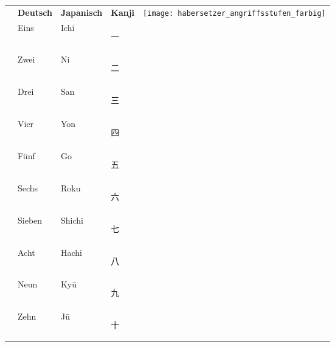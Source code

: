 \begin{tcolorbox}[width=\textwidth,height=\textheight,right=12pt,left=12pt,colframe=lightgray,colback=white,fonttitle=\bfseries,coltitle=black,title=Allgemeines:\indent Zahlen - Angriffsstufen - Begriffe]
	\null\vfill\null	
	\begin{tabularx}{\textwidth}{lllll}		
		& \textbf{Deutsch} 	& \textbf{Japanisch} 	& \textbf{Kanji} &\multirow{13}{*}{\texttt{[image: habersetzer\_angriffsstufen\_farbig]}} \\
		\ctuz 	& Eins 				& Ichi 					& \begin{CJK*}{UTF8}{ipxm}\color{Navy}一\end{CJK*} 	& \\
		\ctuz 	& Zwei 				& Ni 					& \begin{CJK*}{UTF8}{ipxm}\color{Navy}二\end{CJK*} 	& \\ 
		\ctuz 	& Drei 				& San 					& \begin{CJK*}{UTF8}{ipxm}\color{Navy}三\end{CJK*} 	& \\
		\ctuz 	& Vier 				& Yon 					& \begin{CJK*}{UTF8}{ipxm}\color{Navy}四\end{CJK*} 	& \\
		\ctuz 	& Fünf 				& Go 					& \begin{CJK*}{UTF8}{ipxm}\color{Navy}五\end{CJK*} 	& \\
		\ctuz 	& Sechs 			& Roku 					& \begin{CJK*}{UTF8}{ipxm}\color{Navy}六\end{CJK*} 	& \\
		\ctuz 	& Sieben 			& Shichi 				& \begin{CJK*}{UTF8}{ipxm}\color{Navy}七\end{CJK*} 	& \\
		\ctuz 	& Acht 				& Hachi 				& \begin{CJK*}{UTF8}{ipxm}\color{Navy}八\end{CJK*} 	& \\
		\ctuz 	& Neun 				& Kyū 					& \begin{CJK*}{UTF8}{ipxm}\color{Navy}九\end{CJK*} 	& \\
		\ctuz 	& Zehn 				& Jū 					& \begin{CJK*}{UTF8}{ipxm}\color{Navy}十\end{CJK*} 	& \\

\end{tabularx}
\end{tcolorbox}
